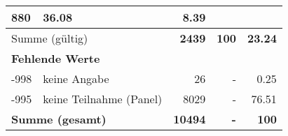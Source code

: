 \begin{longtable}{lXrrr}
       \num{880} &
       \num[round-mode=places,round-precision=2]{36,08} &
         \num[round-mode=places,round-precision=2]{8,39} \\
     \midrule
     \multicolumn{2}{l}{Summe (gültig)} &
       \textbf{\num{2439}} &
     \textbf{100} &
       \textbf{\num[round-mode=places,round-precision=2]{23,24}} \\
     \multicolumn{5}{l}{\textbf{Fehlende Werte}}\\
       -998 &
       keine Angabe &
         \num{26} &
        - &
         \num[round-mode=places,round-precision=2]{0,25} \\
       -995 &
       keine Teilnahme (Panel) &
         \num{8029} &
        - &
         \num[round-mode=places,round-precision=2]{76,51} \\
     \midrule
     \multicolumn{2}{l}{\textbf{Summe (gesamt)}} &
          \textbf{\num{10494}} &
        \textbf{-} &
        \textbf{100} \\
     \bottomrule
     \end{longtable}
     
